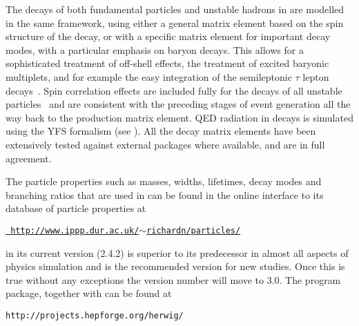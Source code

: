 \mcsubsection{\gensectiondecay}

The decays of both fundamental particles and unstable hadrons in
\Herwigpp are modelled in the same framework, using either a general
matrix element based on the spin structure of the decay, or with a
specific matrix element for important decay modes, with a particular
emphasis on baryon decays. This allows for a
sophisticated treatment of off-shell effects, the treatment of excited
baryonic multiplets, and for example the easy
integration of the semileptonic $\tau$ lepton
decays~\cite{Grellscheid:2007tt}. Spin correlation effects are
included fully for the decays of all unstable
particles~\cite{Richardson:2001df} and are
consistent with the preceding stages of event generation all the way
back to the production matrix element. QED radiation in decays is
simulated using the YFS formalism
\cite{Hamilton:2006xz} (see ). 
All the decay matrix elements have been extensively tested against
external packages where available, and are in full agreement. 

The particle properties such as masses, widths, lifetimes, decay modes
and branching ratios that are used in \Herwigpp can be found
in the online interface to its database of particle properties at
\begin{center}
\href{http://www.ippp.dur.ac.uk/~richardn/particles/}{\tt
  http://www.ippp.dur.ac.uk/$\sim$richardn/particles/}
\end{center}


\Herwigpp in its current version (2.4.2) is 
superior to its \fortran predecessor in almost all aspects of
physics simulation and is the recommended version for new
studies. Once this is true without any exceptions the version 
number will move to 3.0.  The program package, together
with \thepeg can be found at 
\begin{center} 
\texttt{http://projects.hepforge.org/herwig/}
\end{center}


